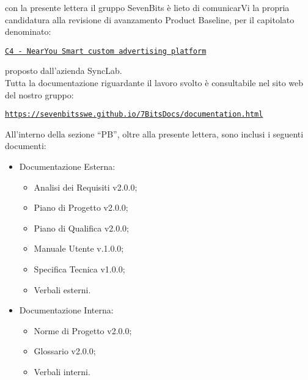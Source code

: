 \documentclass[10pt]{article}
\begin{document}
con la presente lettera il gruppo SevenBits è lieto di comunicarVi la propria candidatura alla revisione di avanzamento Product Baseline, per il capitolato denominato:
\begin{center}
\textcolor{blue}{\texttt{\href{https://www.math.unipd.it/~tullio/IS-1/2024/Progetto/C4.pdf}{C4 - NearYou Smart custom advertising platform}}}\\
\end{center}
proposto dall'azienda SyncLab.\\
Tutta la documentazione riguardante il lavoro svolto è consultabile nel sito web del nostro gruppo:
\begin{center}
\textcolor{blue}{\texttt{\url{https://sevenbitsswe.github.io/7BitsDocs/documentation.html}}}\\
\end{center}
All'interno della sezione ``PB'', oltre alla presente lettera, sono inclusi i seguenti documenti:
\begin{itemize}
\item Documentazione Esterna:
  \begin{itemize}
    \item Analisi dei Requisiti v2.0.0;
    \item Piano di Progetto v2.0.0;
    \item Piano di Qualifica v2.0.0;
    \item Manuale Utente v.1.0.0;
    \item Specifica Tecnica v1.0.0;
    \item Verbali esterni.
  \end{itemize}
\item Documentazione Interna:
  \begin{itemize}
    \item Norme di Progetto v2.0.0;
    \item Glossario v2.0.0;
    \item Verbali interni.
  \end{itemize}
\end{itemize}
\end{document}
